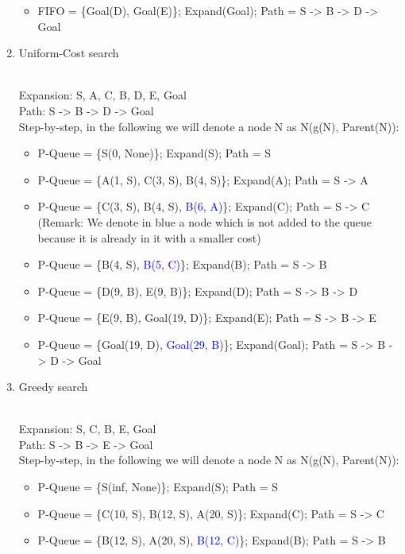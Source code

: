 \documentclass[9pt,a4paper]{extarticle}
\newenvironment{solution}
    {%
    \color{red}
    }
    { 
    \color{black}
    }
\newcommand{\blue}[1]{\textcolor{blue}{#1}}
\begin{document}
\begin{enumerate}
\begin{solution}
\begin{itemize}
            \item FIFO = \{Goal(D), Goal(E)\}; Expand(Goal); Path = S -> B -> D -> Goal
        \end{itemize}
        \end{solution}
        \item Uniform-Cost search
        \begin{solution}
        \\
        Expansion: S, A, C, B, D, E, Goal\\
        Path: S -> B -> D -> Goal\\
        Step-by-step, in the following we will denote a node N as N(g(N), Parent(N)):
        \begin{itemize}
            \item P-Queue = \{S(0, None)\}; Expand(S); Path = S
            \item P-Queue = \{A(1, S), C(3, S), B(4, S)\}; Expand(A); Path = S -> A
            \item P-Queue = \{C(3, S), B(4, S), \blue{B(6, A)}\}; Expand(C); Path = S -> C
            (Remark: We denote in blue a node which is not added to the queue because it is already in it with a smaller cost)
            \item P-Queue = \{B(4, S), \blue{B(5, C)}\}; Expand(B); Path = S -> B
            \item P-Queue = \{D(9, B), E(9, B)\}; Expand(D); Path = S -> B -> D
            \item P-Queue = \{E(9, B), Goal(19, D)\}; Expand(E); Path = S -> B -> E
            \item P-Queue = \{Goal(19, D), \blue{Goal(29, B)}\}; Expand(Goal); Path = S -> B -> D -> Goal
        \end{itemize}
        \end{solution}
        \item Greedy search
        \begin{solution}
        \\
        Expansion: S, C, B, E, Goal\\
        Path: S -> B -> E -> Goal\\
        Step-by-step, in the following we will denote a node N as N(g(N), Parent(N)):
        \begin{itemize}
            \item P-Queue = \{S(inf, None)\}; Expand(S); Path = S
            \item P-Queue = \{C(10, S), B(12, S), A(20, S)\}; Expand(C); Path = S -> C
            \item P-Queue = \{B(12, S), A(20, S), \blue{B(12, C)}\}; Expand(B); Path = S -> B

\end{itemize}
\end{solution}
\end{enumerate}
\end{document}
